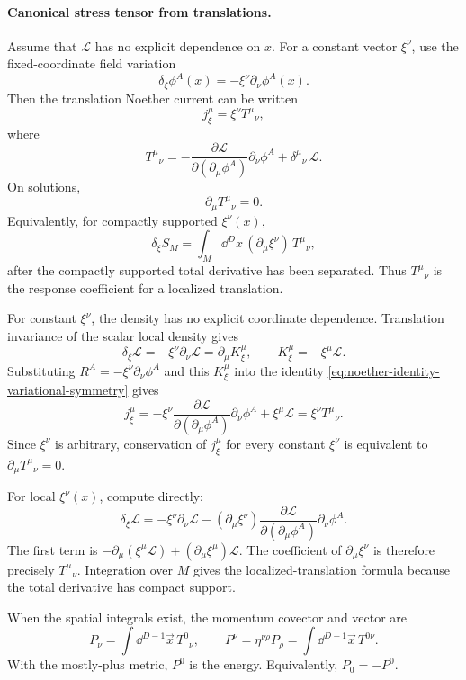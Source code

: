 \paragraph{Canonical stress tensor from translations.}
Assume that \(\mathcal L\) has no explicit dependence on \(x\).  For a
constant vector \(\xi^\nu\), use the fixed-coordinate field variation
\[
  \delta_\xi\phi^A(x)=-\xi^\nu\partial_\nu\phi^A(x).
\]
Then the translation Noether current can be written
\[
  j^\mu_\xi=\xi^\nu T^\mu{}_\nu,
\]
where
\[
  T^\mu{}_\nu
  =
  -
  \frac{\partial\mathcal L}{\partial(\partial_\mu\phi^A)}
  \partial_\nu\phi^A
  +
  \delta^\mu{}_\nu\,\mathcal L .
\]
On solutions,
\[
  \partial_\mu T^\mu{}_\nu=0.
\]
Equivalently, for compactly supported \(\xi^\nu(x)\),
\[
  \delta_\xi S_M
  =
  \int_M\dd^Dx\,(\partial_\mu\xi^\nu)\,T^\mu{}_\nu ,
\]
after the compactly supported total derivative has been separated.  Thus
\(T^\mu{}_\nu\) is the response coefficient for a localized translation.

For constant \(\xi^\nu\), the density has no explicit coordinate dependence.
Translation invariance of the scalar local density gives
\[
  \delta_\xi\mathcal L=-\xi^\nu\partial_\nu\mathcal L
  =
  \partial_\mu K_\xi^\mu,
  \qquad
  K_\xi^\mu=-\xi^\mu\mathcal L .
\]
Substituting \(R^A=-\xi^\nu\partial_\nu\phi^A\) and this \(K_\xi^\mu\) into
the identity \eqref{eq:noether-identity-variational-symmetry} gives
\[
  j_\xi^\mu
  =
  -\xi^\nu
  \frac{\partial\mathcal L}{\partial(\partial_\mu\phi^A)}
  \partial_\nu\phi^A
  +
  \xi^\mu\mathcal L
  =
  \xi^\nu T^\mu{}_\nu .
\]
Since \(\xi^\nu\) is arbitrary, conservation of \(j_\xi^\mu\) for every
constant \(\xi^\nu\) is equivalent to
\(\partial_\mu T^\mu{}_\nu=0\).

For local \(\xi^\nu(x)\), compute directly:
\[
  \delta_\xi\mathcal L
  =
  -\xi^\nu\partial_\nu\mathcal L
  -
  (\partial_\mu\xi^\nu)
  \frac{\partial\mathcal L}{\partial(\partial_\mu\phi^A)}
  \partial_\nu\phi^A .
\]
The first term is
\(-\partial_\mu(\xi^\mu\mathcal L)+(\partial_\mu\xi^\mu)\mathcal L\).
The coefficient of \(\partial_\mu\xi^\nu\) is therefore precisely
\(T^\mu{}_\nu\).  Integration over \(M\) gives the localized-translation
formula because the total derivative has compact support.

\begin{definition}
\label{def:translation-charges}
When the spatial integrals exist, the momentum covector and vector are
\[
  P_\nu=\int\dd^{D-1}\vec x\,T^0{}_\nu,
  \qquad
  P^\nu=\eta^{\nu\rho}P_\rho
  =
  \int\dd^{D-1}\vec x\,T^{0\nu}.
\]
With the mostly-plus metric, \(P^0\) is the energy.  Equivalently,
\(P_0=-P^0\).
\end{definition}


